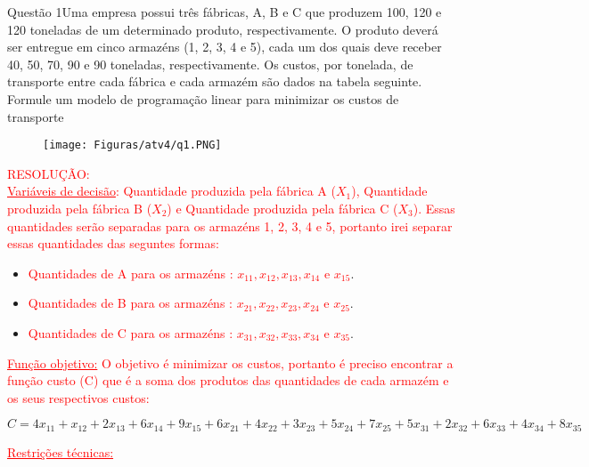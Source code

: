 \documentclass[12pt]{article}
\begin{document}
\begin{section}{Questão 1}{Uma empresa possui três fábricas, A, B e C que produzem 100, 120 e 120 toneladas de um determinado produto, respectivamente. O produto deverá ser entregue em cinco armazéns (1, 2, 3, 4 e 5), cada um dos quais deve receber 40, 50, 70, 90 e 90 toneladas, respectivamente. Os custos, por tonelada, de transporte entre cada fábrica e cada armazém são dados na tabela seguinte. Formule um modelo de programação linear para minimizar os custos de transporte}

\begin{figure}[H]
    \centering
    \texttt{[image: Figuras/atv4/q1.PNG]}
\end{figure}

\noindent \textcolor{red}{RESOLUÇÃO:}\\

\noindent \textcolor{red}{\underline{Variáveis de decisão}: Quantidade produzida pela fábrica A ($X_1$), Quantidade produzida pela fábrica B ($X_2$) e Quantidade produzida pela fábrica C ($X_3$). Essas quantidades serão separadas para os armazéns 1, 2, 3, 4 e 5, portanto irei separar essas quantidades das seguntes formas:}

\begin{itemize}
    \item \textcolor{red}{Quantidades de A para os armazéns : $x_{11},x_{12},x_{13},x_{14} \textrm{ e } x_{15}$}.
    
    \item \textcolor{red}{Quantidades de B para os armazéns : $x_{21},x_{22},x_{23},x_{24} \textrm{ e } x_{25}$}.
    
    \item \textcolor{red}{Quantidades de C para os armazéns : $x_{31},x_{32},x_{33},x_{34} \textrm{ e } x_{35}$}.
\end{itemize}

\noindent \textcolor{red}{\underline{Função objetivo:} O objetivo é minimizar os custos, portanto é preciso encontrar a função custo (C) que é a soma dos produtos das quantidades de cada armazém e os seus respectivos custos:}

$$
    C = 4x_{11} + x_{12} + 2x_{13} + 6x_{14} + 9x_{15} + 6x_{21} + 4x_{22} + 3x_{23} + 5x_{24} + 7x_{25} + 5x_{31} + 2x_{32} + 6x_{33} + 4x_{34} + 8x_{35}
$$

\noindent \textcolor{red}{\underline{Restrições técnicas:}}\\


\end{section}
\end{document}
